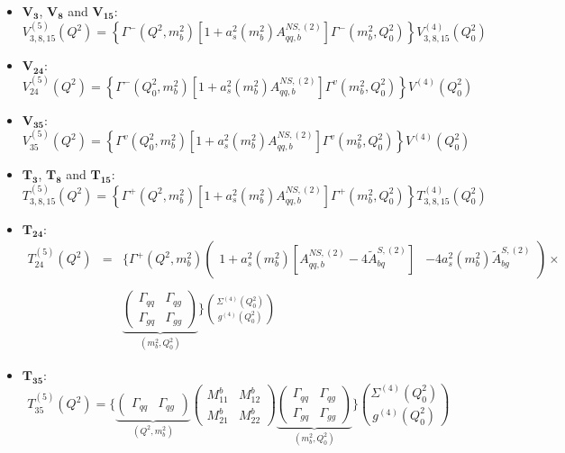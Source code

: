 \documentclass[10pt,a4paper]{article}
\begin{document}
\begin{itemize}
\item $\mathbf{V_3}$, $\mathbf{V_8}$ and $\mathbf{V_{15}}$:
\begin{equation}
V^{(5)}_{3,8,15}(Q^2)=\left\{\Gamma^{-}(Q^2,m_b^2)[1+a_s^2(m_b^2)A_{qq,b}^{N\!S,(2)}]\Gamma^{-}(m_b^2,Q_0^2)\right\}V^{(4)}_{3,8,15}(Q^2_0)
\end{equation}
\item $\mathbf{V_{24}}$:
\begin{equation}
V_{24}^{(5)}(Q^2)=\left\{\Gamma^{-}(Q_0^2,m_b^2)[1+a_s^2(m_b^2)A_{qq,b}^{N\!S,(2)}]\Gamma^{v}(m_b^2,Q_0^2)\right\}V^{(4)}(Q_0^2)
\end{equation}
\item $\mathbf{V_{35}}$:
\begin{equation}
V_{35}^{(5)}(Q^2)=\left\{\Gamma^{v}(Q_0^2,m_b^2)[1+a_s^2(m_b^2)A_{qq,b}^{N\!S,(2)}]\Gamma^{v}(m_b^2,Q_0^2)\right\}V^{(4)}(Q_0^2)
\end{equation}
\item $\mathbf{T_3}$, $\mathbf{T_8}$ and $\mathbf{T_{15}}$:
\begin{equation}
T^{(5)}_{3,8,15}(Q^2)=\left\{\Gamma^{+}(Q^2,m_b^2)[1+a_s^2(m_b^2)A_{qq,b}^{N\!S,(2)}]\Gamma^{+}(m_b^2,Q_0^2)\right\}T^{(4)}_{3,8,15}(Q^2_0)
\end{equation}
\item $\mathbf{T_{24}}$:
\begin{equation}
\begin{array}{rcl}
\displaystyle T_{24}^{(5)}(Q^2)&=&\Bigg\{\Gamma^{+}(Q^2,m_b^2)\begin{pmatrix} 1+a_s^2(m_b^2)[A_{qq,b}^{N\!S,(2)}-4\tilde{A}^{S,(2)}_{bq}] & -4a_s^2(m_b^2)\tilde{A}^{S,(2)}_{bg}\end{pmatrix}\times\\
\\
 & & \displaystyle \underbrace{\begin{pmatrix}\Gamma_{qq}& \Gamma_{qg} \\ \Gamma_{gq} & \Gamma_{gg}\end{pmatrix}}_{(m_b^2,Q_0^2)}\Bigg\}{\Sigma^{(4)}(Q_0^2) \choose g^{(4)}(Q_0^2)}
\end{array}
\end{equation} 
\item $\mathbf{T_{35}}$:
\begin{equation}
T_{35}^{(5)}(Q^2) = \Bigg\{\underbrace{\begin{pmatrix} \Gamma_{qq} & \Gamma_{qg}\end{pmatrix}}_{(Q^2,m_b^2)}\begin{pmatrix} M_{11}^b & M_{12}^b \\ M_{21}^b & M_{22}^b\end{pmatrix}\underbrace{\begin{pmatrix} \Gamma_{qq}& \Gamma_{qg} \\ \Gamma_{gq}& \Gamma_{gg}\end{pmatrix}}_{(m_b^2,Q_0^2)}\Bigg\}{\Sigma^{(4)}(Q_0^2) \choose g^{(4)}(Q_0^2)}
\end{equation}
\end{itemize}
\end{document}
